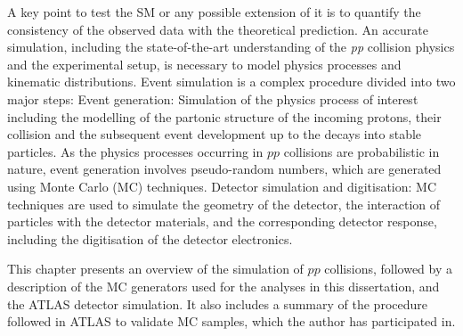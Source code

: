 
\label{chp:evtsim:intro}

A key point to test the SM or any possible extension of it is to quantify the consistency of the observed data with the theoretical prediction. 
An accurate simulation, including  the state-of-the-art understanding of the \emph{pp} collision physics and the experimental setup, is necessary to model physics processes and kinematic distributions.
Event simulation is a complex procedure divided into two major steps:
\bi
\ib Event generation: Simulation of the physics process of interest including the modelling of the partonic structure of the incoming protons, their collision and the subsequent event development up to the decays into stable particles. As the physics processes occurring in $pp$ collisions are probabilistic in nature, event generation involves pseudo-random numbers, which are generated using Monte Carlo (MC) techniques.
\ib Detector simulation and digitisation: MC techniques are used to simulate the geometry of the detector, the interaction of particles with the detector materials, and the corresponding detector response, including the digitisation of the detector electronics.
\ei

This chapter presents an overview of the simulation of $pp$ collisions, followed by a description of the MC generators used for the analyses in this dissertation, and the ATLAS detector simulation. It also includes a summary of the procedure followed in ATLAS to validate MC samples, which the author has participated in.\\